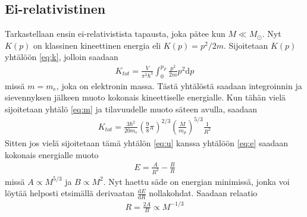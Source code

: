 \documentclass[12pt,a4paper,titlepage]{article}
\begin{document}
\subsection{Ei-relativistinen}
Tarkastellaan ensin ei-relativistista tapausta, joka pätee kun $M \ll M_{\odot}$. Nyt $K(p)$ on klassinen kineettinen energia eli $K(p) = p^2/2 m$. Sijoitetaan $K(p)$ yhtälöön \eqref{eq:k}, jolloin saadaan
\begin{align}
K_{tot} = \frac{V}{\pi^2 \hbar^3} \int_0^{p_F} \frac{p^2}{2 m} p^2 \mathrm{d}p 
\end{align}
missä $m = m_e$, joka on elektronin massa. Tästä yhtälöstä saadaan integroinnin ja sievennyksen jälkeen muoto kokonais kineettiselle energialle. Kun tähän vielä sijoitetaan yhtälö \eqref{eq:m} ja tilavuudelle muoto säteen avulla, saadaan
\begin{align}
K_{tot} = \frac{3 \hbar^2}{20 m_e} \left( \frac{9}{8} \pi \right)^{2/3} \left(\frac{M}{m_p} \right)^{5/3} \frac{1}{R^2}
\end{align}
Sitten jos vielä sijoitetaan tämä yhtälön \eqref{eq:u} kanssa yhtälöön \eqref{eq:e} saadaan kokonais energialle muoto
\begin{align}
E = \frac{A}{R^2} - \frac{B}{R} 
\end{align}
missä $A \propto M^{5/3}$ ja $B \propto M^2$. Nyt haettu säde on energian minimissä, jonka voi löytää helposti etsimällä derivaatan $\frac{\mathrm{d}E}{\mathrm{d}R}$ nollakohdat. Saadaan relaatio
\begin{align}
R = \frac{2 A}{B} \propto M^{-1/3} \label{eq:eirela}
\end{align}
\end{document}
